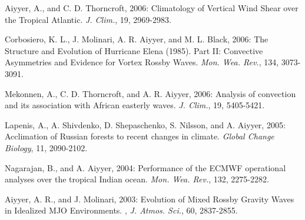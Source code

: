 \begin{ilist}
\item Aiyyer, A., and C. D. Thorncroft, 2006: Climatology of Vertical Wind Shear over the Tropical Atlantic. \emph{J. Clim.}, 19, 2969-2983.

\item Corbosiero, K. L., J. Molinari, A. R. Aiyyer, and M. L. Black, 2006: The Structure and Evolution of Hurricane Elena (1985). Part II: Convective Asymmetries and Evidence for Vortex Rossby Waves. \emph{Mon. Wea. Rev.}, 134, 3073-3091. 

\item Mekonnen, A., C. D. Thorncroft, and A. R. Aiyyer, 2006: Analysis of convection and its association with African easterly waves. \emph{J. Clim.}, 19, 5405-5421.

\item Lapenis, A., A. Shivdenko, D. Shepaschenko, S. Nilsson, and A. Aiyyer, 2005: Acclimation of Russian forests to recent changes in climate. \emph{ Global Change Biology}, 11, 2090-2102.

\item Nagarajan, B., and A. Aiyyer, 2004: Performance of the ECMWF operational analyses over the tropical Indian ocean. \emph{Mon. Wea. Rev.}, 132, 2275-2282. 

\item Aiyyer, A. R., and J. Molinari, 2003: Evolution of Mixed Rossby Gravity Waves in Idealized MJO Environments. , \emph{J. Atmos. Sci.}, 60, 2837-2855.

\end{ilist}

